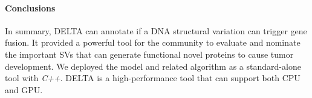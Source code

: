 \documentclass{article}
\begin{document}
\paragraph*{Conclusions}
In summary, DELTA can annotate if a DNA structural variation can trigger gene fusion.
It provided a powerful tool for the community to evaluate and nominate the important SVs that can generate functional novel proteins to cause tumor development.
We deployed the model and related algorithm as a standard-alone tool with \textit{C++}. DELTA is a high-performance tool that can support both CPU and GPU\@.



















% 
% 
\end{document}
